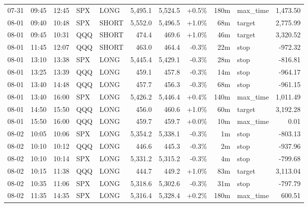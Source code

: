 \documentclass[11pt,a4paper,twoside]{article}
\begin{document}
\begin{center}
\begin{longtable}{>{\color{txtmain}}l l l l l r r r r >{\color{txtmain}}l r}
07-31 & 09:45 & 12:45 & SPX & LONG & 5,495.1 & 5,524.5 & \textcolor{wingreen}{+0.5\%} & 180m & max\_time & \textcolor{wingreen}{1,473.50} \\
08-01 & 09:40 & 10:48 & SPX & SHORT & 5,552.0 & 5,496.5 & \textcolor{wingreen}{+1.0\%} & 68m & target & \textcolor{wingreen}{2,775.99} \\
08-01 & 09:45 & 10:31 & QQQ & SHORT & 474.4 & 469.6 & \textcolor{wingreen}{+1.0\%} & 46m & target & \textcolor{wingreen}{3,320.52} \\
08-01 & 11:45 & 12:07 & QQQ & SHORT & 463.0 & 464.4 & \textcolor{lossred}{-0.3\%} & 22m & stop & \textcolor{lossred}{-972.32} \\
08-01 & 13:10 & 13:38 & SPX & LONG & 5,445.4 & 5,429.1 & \textcolor{lossred}{-0.3\%} & 28m & stop & \textcolor{lossred}{-816.81} \\
08-01 & 13:25 & 13:39 & QQQ & LONG & 459.1 & 457.8 & \textcolor{lossred}{-0.3\%} & 14m & stop & \textcolor{lossred}{-964.17} \\
08-01 & 13:40 & 14:48 & QQQ & LONG & 457.7 & 456.3 & \textcolor{lossred}{-0.3\%} & 68m & stop & \textcolor{lossred}{-961.15} \\
08-01 & 13:40 & 16:00 & SPX & LONG & 5,426.2 & 5,446.4 & \textcolor{wingreen}{+0.4\%} & 140m & max\_time & \textcolor{wingreen}{1,011.49} \\
08-01 & 14:50 & 15:50 & QQQ & LONG & 456.0 & 460.6 & \textcolor{wingreen}{+1.0\%} & 60m & target & \textcolor{wingreen}{3,192.28} \\
08-01 & 15:50 & 16:00 & QQQ & LONG & 459.7 & 459.7 & \textcolor{wingreen}{+0.0\%} & 10m & max\_time & \textcolor{wingreen}{0.01} \\
08-02 & 10:05 & 10:06 & SPX & LONG & 5,354.2 & 5,338.1 & \textcolor{lossred}{-0.3\%} & 1m & stop & \textcolor{lossred}{-803.13} \\
08-02 & 10:10 & 10:12 & QQQ & LONG & 446.6 & 445.3 & \textcolor{lossred}{-0.3\%} & 2m & stop & \textcolor{lossred}{-937.96} \\
08-02 & 10:10 & 10:14 & SPX & LONG & 5,331.2 & 5,315.2 & \textcolor{lossred}{-0.3\%} & 4m & stop & \textcolor{lossred}{-799.68} \\
08-02 & 10:15 & 11:38 & QQQ & LONG & 444.7 & 449.2 & \textcolor{wingreen}{+1.0\%} & 83m & target & \textcolor{wingreen}{3,113.04} \\
08-02 & 10:35 & 11:06 & SPX & LONG & 5,318.6 & 5,302.6 & \textcolor{lossred}{-0.3\%} & 31m & stop & \textcolor{lossred}{-797.79} \\
08-02 & 11:35 & 14:35 & SPX & LONG & 5,316.4 & 5,328.4 & \textcolor{wingreen}{+0.2\%} & 180m & max\_time & \textcolor{wingreen}{600.51} \\

\end{longtable}
\end{center}
\end{document}
